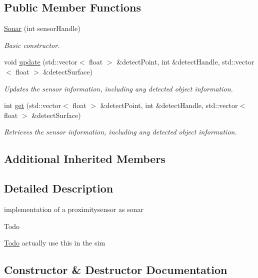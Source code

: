 \subsection*{Public Member Functions}
\begin{DoxyCompactItemize}
\item 
\hyperlink{classSonar_ae6edd4f329f9892a64c5f0cab808c7a2}{Sonar} (int sensor\+Handle)
\begin{DoxyCompactList}\small\item\em Basic constructor. \end{DoxyCompactList}\item 
void \hyperlink{classSonar_a2be4378ffd51271865a84822faffd78d}{update} (std\+::vector$<$ float $>$ \&detect\+Point, int \&detect\+Handle, std\+::vector$<$ float $>$ \&detect\+Surface)
\begin{DoxyCompactList}\small\item\em Updates the sensor information, including any detected object information. \end{DoxyCompactList}\item 
int \hyperlink{classSonar_a6881d0c104c0fafad95ad1aea917b6f3}{get} (std\+::vector$<$ float $>$ \&detect\+Point, int \&detect\+Handle, std\+::vector$<$ float $>$ \&detect\+Surface)
\begin{DoxyCompactList}\small\item\em Retrieves the sensor information, including any detected object information. \end{DoxyCompactList}\end{DoxyCompactItemize}
\subsection*{Additional Inherited Members}


\subsection{Detailed Description}
implementation of a proximitysensor as sonar 

\begin{DoxyRefDesc}{Todo}
\item[\hyperlink{todo__todo000008}{Todo}]actually use this in the sim \end{DoxyRefDesc}


\subsection{Constructor \& Destructor Documentation}
